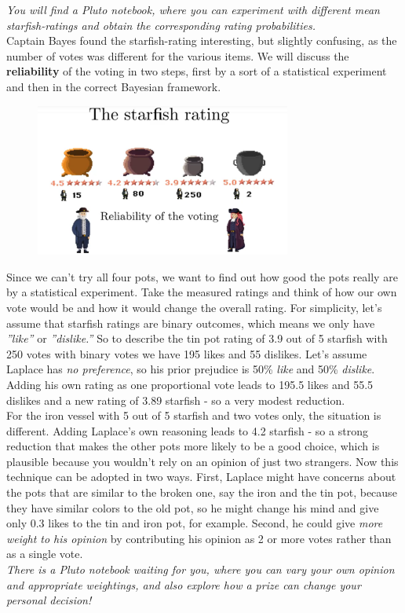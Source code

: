 \documentclass[12pt, a4paper]{scrartcl}
\begin{document}
\textit{You will find a Pluto notebook, where you can experiment with different
mean starfish-ratings and obtain the corresponding rating probabilities.}\\

Captain Bayes found the starfish-rating interesting, but slightly confusing,
as the number of votes was different for the various items. We will discuss
the \textbf{reliability} of the voting in two steps, first by a sort of a statistical experiment and
then in the correct Bayesian framework.\\%
 \begin{figure}[H]
	\centering
	\includegraphics[width=0.75\textwidth]{6_9.png}
\end{figure}

Since we can’t try all four pots, we want to find out how good the pots really are
by a statistical experiment.
Take the measured ratings and think of how our own vote would be and how
it would change the overall rating.
For simplicity, let’s assume that starfish ratings are binary outcomes, which means we only have
\textit{”like”} or \textit{”dislike.”} So to describe the tin pot rating of 3.9 out of 5 starfish
with 250 votes with binary votes we have 195 likes and 55 dislikes. Let’s
assume Laplace has \textit{no preference}, so his prior prejudice is 50\% \textit{like} and 50\%
\textit{dislike}. Adding his own rating as one proportional vote leads to 195.5 likes
and 55.5 dislikes and a new rating of 3.89 starfish - so a very modest reduction.\\

For the iron vessel with 5 out of 5 starfish and two votes only, the situation is
different. Adding Laplace’s own reasoning leads to 4.2 starfish - so a strong
reduction that makes the other pots more likely to be a good choice, which
is plausible because you wouldn’t rely on an opinion of just two strangers.
Now this technique can be adopted in two ways. First, Laplace might have
concerns about the pots that are similar to the broken one, say the iron and
the tin pot, because they have similar colors to the old pot, so he might
change his mind and give only 0.3 likes to the tin and iron pot, for example.
Second, he could give \textit{more weight to his opinion} by contributing his opinion
as 2 or more votes rather than as a single vote.\\
\textit{There is a Pluto notebook waiting for you, where you can vary your own
opinion and appropriate weightings, and also explore how a prize can change
your personal decision!}\\
\end{document}
